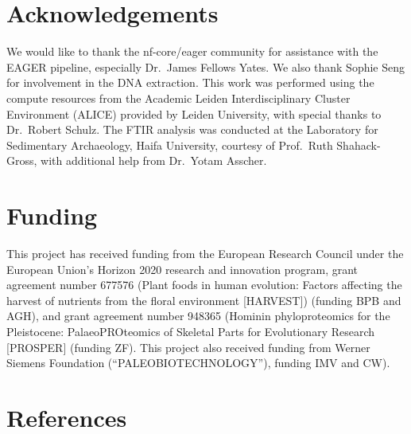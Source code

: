 \documentclass[10pt,a4paper]{article}
\begin{document}
\section*{Acknowledgements}\label{acknowledgements}

We would like to thank the nf-core/eager community for assistance with
the EAGER pipeline, especially Dr.~James Fellows Yates. We also thank
Sophie Seng for involvement in the DNA extraction. This work was
performed using the compute resources from the Academic Leiden
Interdisciplinary Cluster Environment (ALICE) provided by Leiden
University, with special thanks to Dr.~Robert Schulz. The FTIR analysis
was conducted at the Laboratory for Sedimentary Archaeology, Haifa
University, courtesy of Prof.~Ruth Shahack-Gross, with additional help
from Dr.~Yotam Asscher.

\section{Funding}\label{funding}

This project has received funding from the European Research Council
under the European Union's Horizon 2020 research and innovation program,
grant agreement number 677576 (Plant foods in human evolution: Factors
affecting the harvest of nutrients from the floral environment
{[}HARVEST{]}) (funding BPB and AGH), and grant agreement number 948365
(Hominin phyloproteomics for the Pleistocene: PalaeoPROteomics of
Skeletal Parts for Evolutionary Research {[}PROSPER{]} (funding ZF).
This project also received funding from Werner Siemens Foundation
(``PALEOBIOTECHNOLOGY''), funding IMV and CW).

\section*{References}\label{references}

\renewcommand{\bibsection}{}

\end{document}
